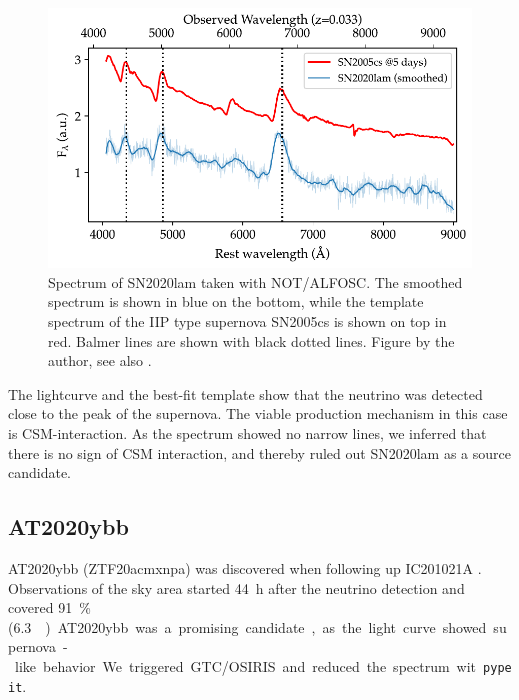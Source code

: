 \documentclass[
    a4paper, %
    fontsize=10pt, %
    twoside=true, %
    numbers=noenddot, %
    fontmethod=tex,
]{kaobook}
\begin{document}
\begin{figure}[h!]
    \includegraphics[width=1\textwidth]{fu/ZTF20abbpkpa_not_spectrum.pdf}
    \caption[SN2020lam spectrum]{Spectrum of SN2020lam taken with NOT/ALFOSC. The smoothed spectrum is shown in blue on the bottom, while the template spectrum of the IIP type supernova SN2005cs is shown on top in red. Balmer lines are shown with black dotted lines. Figure by the author, see also \cite{Stein2023a}.}
\end{figure}
The lightcurve and the best-fit template show that the neutrino was detected close to the peak of the supernova. The viable production mechanism in this case is CSM-interaction. As the spectrum showed no narrow lines, we inferred that there is no sign of CSM interaction, and thereby ruled out SN2020lam as a source candidate.

\subsection{AT2020ybb}
AT2020ybb (ZTF20acmxnpa) was discovered when following up IC201021A . Observations of the sky area started \SI{44}{\hour} after the neutrino detection and covered \SI{91}{\percent} (\SI{6.3}{\square\deg}).

AT2020ybb was a promising candidate, as the light curve showed supernova-like behavior. We triggered GTC/OSIRIS and reduced the spectrum wit \texttt{pypeit}.

\end{document}
